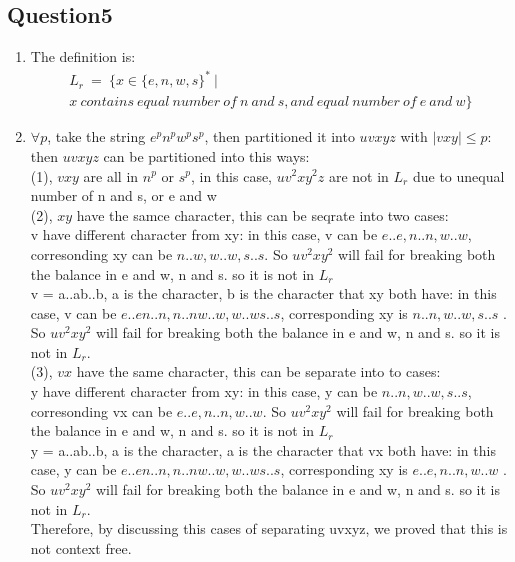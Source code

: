 \documentclass[11pt]{article}
\begin{document}
\subsection*{Question5}
\begin{enumerate}

\item
The definition is:
\[
\begin{array}{lr}
	L_r\  =\ \{x \in \{e,n,w,s\}^*\ | \\ x \ contains\ equal\ number\  of\ n\ and\ s, and\ equal\ number\ of\ e\ and\ w\}
\end{array}
\]

\item
$\forall p$, take the string $e^pn^pw^ps^p$, then partitioned it into $uvxyz$ with $|vxy|\leq p$:\\
then $uvxyz$ can be partitioned into this ways:\\
(1), $vxy$ are all in $n^p$ or $s^p$, in this case, $uv^2xy^2z$ are not in $L_r$ due to unequal number of n and s, or e and w\\
(2), $xy$ have the samce character, this can be seqrate into two cases:\\
\hspace*{2em} v have different character from xy: in this case, v can be $e..e,n..n,w..w$, corresonding xy can be $n..w,w..w,s..s$. So $uv^2xy^2$ will fail for breaking both the balance in e and w, n and s. so it is not in $L_r$\\
\hspace*{2em} v  = a..ab..b, a is the character, b is the character that xy both have: in this case, v can be $e..en..n, n..nw..w, w..ws..s$, corresponding xy is $n..n,w..w,s..s$ . So $uv^2xy^2$ will fail for breaking both the balance in e and w, n and s. so it is not in $L_r$.\\
(3), $vx$ have the same character, this can be separate into to cases:\\
\hspace*{2em} y have different character from xy: in this case, y can be $n..n,w..w,s..s$, corresonding vx can be $e..e,n..n,w..w$. So $uv^2xy^2$ will fail for breaking both the balance in e and w, n and s. so it is not in $L_r$\\
\hspace*{2em} y  = a..ab..b, a is the character, a is the character that vx both have: in this case, y can be $e..en..n, n..nw..w, w..ws..s$, corresponding xy is $e..e,n..n,w..w$ . So $uv^2xy^2$ will fail for breaking both the balance in e and w, n and s. so it is not in $L_r$.\\
Therefore, by discussing this cases of separating uvxyz, we proved that this is not context free.


\end{enumerate}
\end{document}
